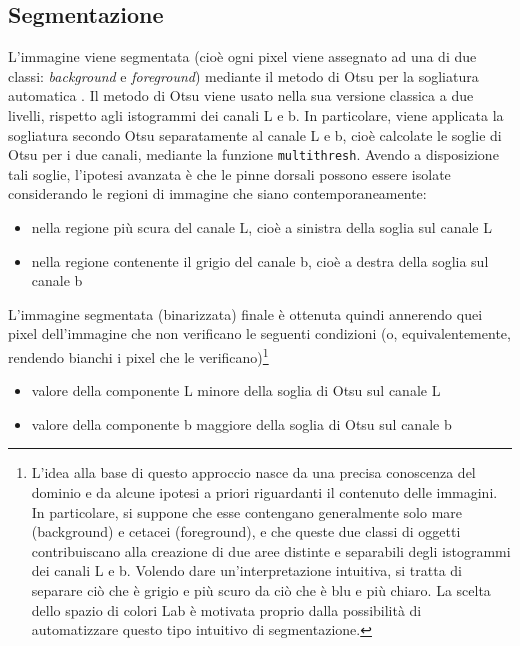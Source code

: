 \subsection*{Segmentazione}
L'immagine viene segmentata (cioè ogni pixel viene assegnato ad una di due classi: \textit{background} e \textit{foreground}) mediante il metodo di Otsu per la sogliatura automatica \cite{otsu}. Il metodo di Otsu viene usato nella sua versione classica a due livelli, rispetto agli istogrammi dei canali L e b. In particolare, viene applicata la sogliatura secondo Otsu separatamente al canale L e b, cioè calcolate le soglie di Otsu per i due canali, mediante la funzione \verb|multithresh|.
Avendo a disposizione tali soglie, l’ipotesi avanzata è che le pinne dorsali possono essere
isolate considerando le regioni di immagine che siano contemporaneamente:
\begin{itemize}
\item nella regione più scura del canale L, cioè a sinistra della soglia sul canale L
\item nella regione contenente il grigio del canale b, cioè a destra della soglia sul canale b
\end{itemize}
L'immagine segmentata (binarizzata) finale è ottenuta quindi annerendo quei pixel dell'immagine che non verificano le seguenti condizioni (o, equivalentemente, rendendo bianchi i pixel che le verificano)\footnote{L’idea alla base di questo approccio nasce da una precisa conoscenza del dominio e da
alcune ipotesi a priori riguardanti il contenuto delle immagini. In particolare, si suppone
che esse contengano generalmente solo mare (background) e cetacei (foreground),
e che queste due classi di oggetti contribuiscano alla creazione di due aree distinte e
separabili degli istogrammi dei canali L e b. Volendo dare un’interpretazione intuitiva,
si tratta di separare ciò che è grigio e più scuro da ciò che è blu e più chiaro. La scelta
dello spazio di colori Lab è motivata proprio dalla possibilità di automatizzare questo
tipo intuitivo di segmentazione.}
\begin{itemize}
\item valore della componente L minore della soglia di Otsu sul canale L
\item valore della componente b maggiore della soglia di Otsu sul canale b
\end{itemize}

